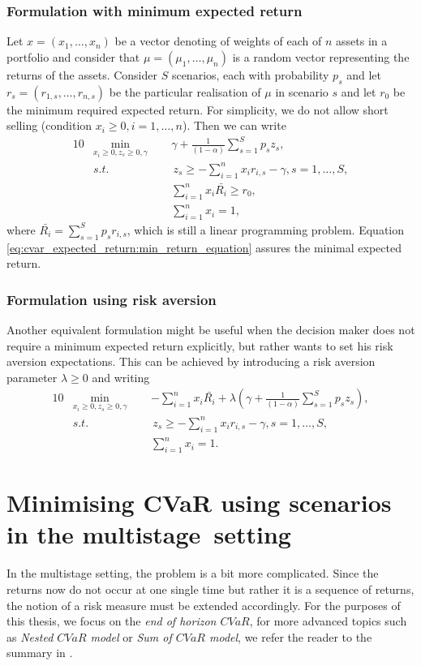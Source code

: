 \subsubsection*{Formulation with minimum expected return}
Let $x=(x_1,\dots,x_n)$ be a vector denoting of weights of each of $n$ assets in a portfolio and consider that $\mu=(\mu_1,\dots,\mu_n)$ is a random vector representing the returns of the assets. Consider $S$ scenarios, each with probability $p_s$ and let $r_s = (r_{1,s},\dots,r_{n,s})$ be the particular realisation of $\mu$ in scenario $s$ and let $r_0$ be the minimum required expected return. For simplicity, we do not allow short selling (condition $x_i \geq 0, i=1,\dots,n$). Then we can write
\begin{alignat}{10}
& \underset{x_i \geq 0 , z_s \geq 0, \gamma}{\min}  \, \, \, && \gamma + \frac{1}{(1-\alpha)} \sum_{s=1}^S p_s z_s, \label{cvar_expected_return}  \\
&s.t. && \, z_s \geq  -\sum_{i=1}^{n} x_i r_{i,s} -\gamma, s=1,\dots,S, \nonumber \\
&  && \sum_{i=1}^{n} x_i \bar{R_i} \geq r_0, \label{eq:cvar_expected_return:min_return_equation} \\
&  && \sum_{i=1}^{n} x_i = 1, \nonumber
\end{alignat}
where $\bar{R_i}=\sum_{s=1}^{S}p_s r_{i,s}$, which is still a linear programming problem. Equation \ref{eq:cvar_expected_return:min_return_equation} assures the minimal expected return.
\subsubsection*{Formulation using risk aversion}
Another equivalent formulation might be useful when the decision maker does not require a minimum expected return explicitly, but rather wants to set his risk aversion expectations. This can be achieved by introducing a risk aversion parameter $\lambda \geq 0$ and writing
\begin{alignat}{10}
& \underset{x_i \geq 0 , z_s \geq 0, \gamma}{\min}  \, \, \, && - \sum_{i=1}^{n} x_i \bar{R_i} + \lambda \left( \gamma + \frac{1}{(1-\alpha)} \sum_{s=1}^S p_s z_s \right), \label{eq:cvar_risk_aversion} \\
&s.t. && \, z_s \geq  -\sum_{i=1}^{n} x_i r_{i,s} -\gamma, s=1,\dots,S, \nonumber \\
&  && \sum_{i=1}^{n} x_i = 1. \nonumber
\end{alignat}
\section{Minimising CVaR using scenarios in the multistage~setting}
In the multistage setting, the problem is a bit more complicated. Since the returns now do not occur at one single time but rather it is a sequence of returns, the notion of a risk measure must be extended accordingly. For the purposes of this thesis, we focus on the \textit{end of horizon $CVaR$}, for more advanced topics such as \textit{Nested $CVaR$ model} or \textit{Sum of $CVaR$ model}, we refer the reader to the summary in \cite[Section 1.4.]{kozmikv_phdthesis}.

